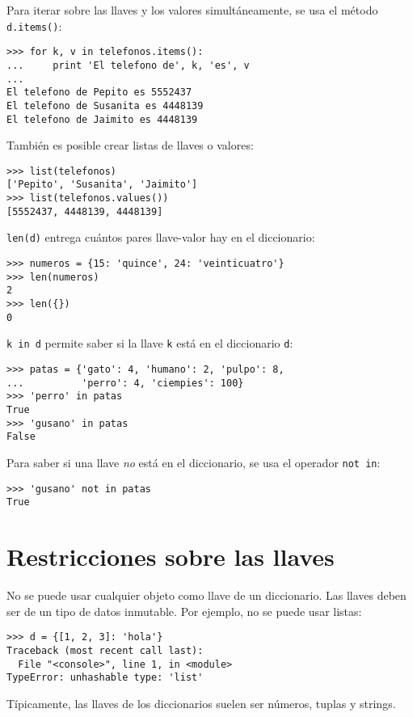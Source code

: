 Para iterar sobre las llaves y los valores simultáneamente, se usa el
método \lstinline!d.items()!:

\begin{lstlisting}
>>> for k, v in telefonos.items():
...     print 'El telefono de', k, 'es', v
...
El telefono de Pepito es 5552437
El telefono de Susanita es 4448139
El telefono de Jaimito es 4448139
\end{lstlisting}

También es posible crear listas de llaves o valores:

\begin{lstlisting}
>>> list(telefonos)
['Pepito', 'Susanita', 'Jaimito']
>>> list(telefonos.values())
[5552437, 4448139, 4448139]
\end{lstlisting}

\lstinline!len(d)! entrega cuántos pares llave-valor hay en el
diccionario:

\begin{lstlisting}
>>> numeros = {15: 'quince', 24: 'veinticuatro'}
>>> len(numeros)
2
>>> len({})
0
\end{lstlisting}

\lstinline!k in d! permite saber si la llave \lstinline!k! está en el
diccionario \lstinline!d!:

\begin{lstlisting}
>>> patas = {'gato': 4, 'humano': 2, 'pulpo': 8,
...          'perro': 4, 'ciempies': 100}
>>> 'perro' in patas
True
>>> 'gusano' in patas
False
\end{lstlisting}

Para saber si una llave \emph{no} está en el diccionario, se usa el
operador \lstinline!not in!:

\begin{lstlisting}
>>> 'gusano' not in patas
True
\end{lstlisting}

\section{Restricciones sobre las llaves}

No se puede usar cualquier objeto como llave de un diccionario. Las
llaves deben ser de un tipo de datos inmutable. Por ejemplo, no se puede
usar listas:

\begin{lstlisting}
>>> d = {[1, 2, 3]: 'hola'}
Traceback (most recent call last):
  File "<console>", line 1, in <module>
TypeError: unhashable type: 'list'
\end{lstlisting}

Típicamente, las llaves de los diccionarios suelen ser números, tuplas y strings.
